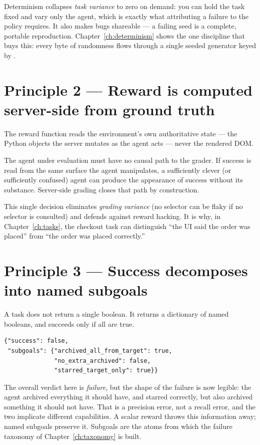 \documentclass[11pt,openany]{book}
\newcommand{\code}[1]{\textcolor{clayd}{\texttt{\detokenize{#1}}}}
\begin{document}
Determinism collapses \emph{task variance} to zero on demand: you can hold the
task fixed and vary only the agent, which is exactly what attributing a failure
to the policy requires. It also makes bugs shareable — a failing seed is a
complete, portable reproduction. Chapter~\ref{ch:determinism} shows the one
discipline that buys this: every byte of randomness flows through a single seeded
generator keyed by \code{(task_id, seed)}.

\section{Principle 2 — Reward is computed server-side from ground truth}

The reward function reads the environment's own authoritative state — the Python
objects the server mutates as the agent acts — never the rendered DOM.

\begin{principle}[.\ ]
The agent under evaluation must have no causal path to the grader. If success is
read from the same surface the agent manipulates, a sufficiently clever (or
sufficiently confused) agent can produce the appearance of success without its
substance. Server-side grading closes that path by construction.
\end{principle}

This single decision eliminates \emph{grading variance} (no selector can be
flaky if no selector is consulted) and defends against reward hacking. It is why,
in Chapter~\ref{ch:tasks}, the checkout task can distinguish ``the UI said the
order was placed'' from ``the order was placed correctly.''

\section{Principle 3 — Success decomposes into named subgoals}

A task does not return a single boolean. It returns a dictionary of named
booleans, and succeeds only if all are true.

\begin{lstlisting}[style=js]
{"success": false,
 "subgoals": {"archived_all_from_target": true,
              "no_extra_archived": false,
              "starred_target_only": true}}
\end{lstlisting}

The overall verdict here is \emph{failure}, but the shape of the failure is now
legible: the agent archived everything it should have, and starred correctly, but
also archived something it should not have. That is a precision error, not a
recall error, and the two implicate different capabilities. A scalar reward
throws this information away; named subgoals preserve it. Subgoals are the
atoms from which the failure taxonomy of Chapter~\ref{ch:taxonomy} is built.
\end{document}
